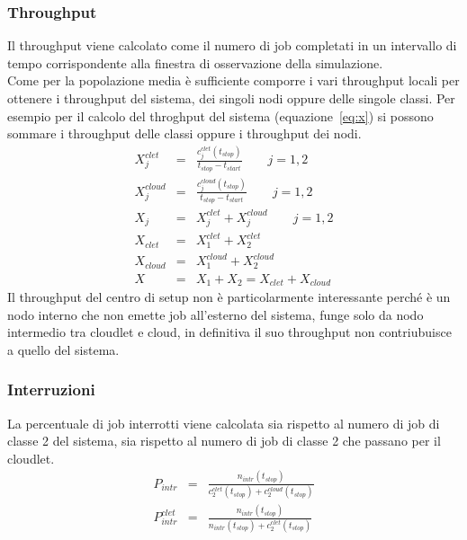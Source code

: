 \subsubsection{Throughput}
Il throughput viene calcolato come il numero di job completati in un intervallo
di tempo corrispondente alla finestra di osservazione della simulazione.\\
Come per la popolazione media è sufficiente comporre i vari throughput locali
per ottenere i throughput del sistema, dei singoli nodi oppure delle singole
classi. Per esempio per il calcolo del throghput del sistema
(equazione~\ref{eq:x}) si possono sommare i throughput delle classi oppure i
throughput dei nodi.
\begin{eqnarray}
\label{eq:xjclet}
X_j^{clet} & = & \frac{c_j^{clet}(t_{stop})}{t_{stop} - t_{start}} 
\qquad j = 1, 2 
\\[10pt]
\label{eq:xjcloud}
X_j^{cloud} & = & \frac{c_j^{cloud}(t_{stop})}{t_{stop} - t_{start}} 
\qquad j = 1, 2 
\\[10pt]
\label{eq:xj}
X_j & = & X_j^{clet} + X_j^{cloud}
\qquad j = 1, 2 
\\[10pt]
\label{eq:xclet}
X_{clet} & = & X_1^{clet} + X_2^{clet}
\\[10pt]
\label{eq:xcloud}
X_{cloud} & = & X_1^{cloud} + X_2^{cloud}
\\[10pt]
\label{eq:x}
X & = & X_1 + X_2 = X_{clet} + X_{cloud}
\end{eqnarray}
Il throughput del centro di setup non è particolarmente interessante perché è un
nodo interno che non emette job all'esterno del sistema, funge solo da nodo
intermedio tra cloudlet e cloud, in definitiva il suo throughput non
contriubuisce a quello del sistema.
\subsubsection{Interruzioni}
La percentuale di job interrotti viene calcolata sia rispetto al numero di job di
classe 2 del sistema, sia rispetto al numero di job di classe 2 che passano per
il cloudlet.
\begin{eqnarray}
P_{intr} &=& 
\frac{n_{intr}(t_{stop})}{c_2^{clet}(t_{stop}) + c_2^{cloud}(t_{stop})} \\[10pt]
P_{intr}^{clet} &=& 
\frac{n_{intr}(t_{stop})}{n_{intr}(t_{stop}) + c_2^{clet}(t_{stop})}
\end{eqnarray}
%
